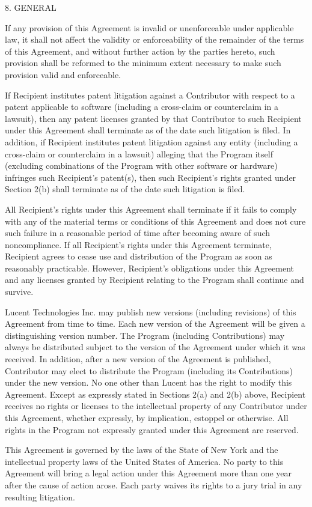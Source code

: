 8. GENERAL 

If any provision of this Agreement is invalid or unenforceable under
applicable law, it shall not affect the validity or enforceability of
the remainder of the terms of this Agreement, and without further
action by the parties hereto, such provision shall be reformed to the
minimum extent necessary to make such provision valid and
enforceable. 


If Recipient institutes patent litigation against a Contributor with
respect to a patent applicable to software (including a cross-claim or
counterclaim in a lawsuit), then any patent licenses granted by that
Contributor to such Recipient under this Agreement shall terminate as
of the date such litigation is filed. In addition, if Recipient
institutes patent litigation against any entity (including a
cross-claim or counterclaim in a lawsuit) alleging that the Program
itself (excluding combinations of the Program with other software or
hardware) infringes such Recipient's patent(s), then such Recipient's
rights granted under Section 2(b) shall terminate as of the date such
litigation is filed. 

All Recipient's rights under this Agreement shall terminate if it
fails to comply with any of the material terms or conditions of this
Agreement and does not cure such failure in a reasonable period of
time after becoming aware of such noncompliance. If all Recipient's
rights under this Agreement terminate, Recipient agrees to cease use
and distribution of the Program as soon as reasonably
practicable. However, Recipient's obligations under this Agreement and
any licenses granted by Recipient relating to the Program shall
continue and survive. 

Lucent Technologies Inc. may publish new versions (including
revisions) of this Agreement from time to time. Each new version of
the Agreement will be given a distinguishing version number. The
Program (including Contributions) may always be distributed subject to
the version of the Agreement under which it was received. In addition,
after a new version of the Agreement is published, Contributor may
elect to distribute the Program (including its Contributions) under
the new version. No one other than Lucent has the right to modify this
Agreement. Except as expressly stated in Sections 2(a) and 2(b) above,
Recipient receives no rights or licenses to the intellectual property
of any Contributor under this Agreement, whether expressly, by
implication, estoppel or otherwise. All rights in the Program not
expressly granted under this Agreement are reserved. 


This Agreement is governed by the laws of the State of New York and
the intellectual property laws of the United States of America. No
party to this Agreement will bring a legal action under this Agreement
more than one year after the cause of action arose. Each party waives
its rights to a jury trial in any resulting litigation. 


